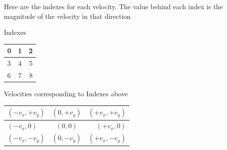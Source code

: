 \documentclass{article}
\begin{document}
Here are the indexes for each velocity. The value behind each index is the magnitude of the velocity in that direction\newline
\begin{center}
Indexes ~
\begin{tabular}{l c r}
	\hline
	0 & 1 & 2 \\ \hline
	3 & 4 & 5 \\ \hline
	6 & 7 & 8 \\ 
	\hline
\end{tabular}
\end{center}

\begin{center}
Velocities corresponding to Indexes above ~
\begin{tabular}{l c r}
	\hline
	$(-v_x,+v_y)$ & $(0,+v_y)$ & $(+v_x,+v_y)$ \\ \hline
	$(-v_x,0)$ & $(0,0)$ & $(+v_x,0)$ \\ \hline
	$(-v_x,-v_y)$ & $(0,-v_y)$ & $(+v_x,-v_y)$ \\ 
	\hline
\end{tabular}
\end{center}
\end{document}
